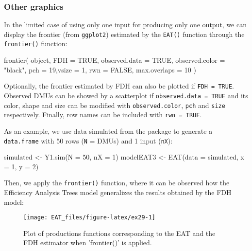 \hypertarget{other-graphics}{%
\subsubsection{Other graphics}\label{other-graphics}}

In the limited case of using only one input for producing only one
output, we can display the frontier (from \texttt{ggplot2}) estimated by
the \texttt{EAT()} function through the \texttt{frontier()} function:

\begin{Schunk}
\begin{Sinput}
frontier(
  object, FDH = TRUE,
  observed.data = TRUE,
  observed.color = "black",
  pch = 19,vsize = 1,
  rwn = FALSE,
  max.overlaps = 10
)
\end{Sinput}
\end{Schunk}

Optionally, the frontier estimated by FDH can also be plotted if
\texttt{FDH\ =\ TRUE}. Observed DMUs can be showed by a scatterplot if
\texttt{observed.data\ =\ TRUE} and its color, shape and size can be
modified with \texttt{observed.color}, \texttt{pch} and \texttt{size}
respectively. Finally, row names can be included with
\texttt{rwn\ =\ TRUE}.

As an example, we use data simulated from the  package to
generate a \texttt{data.frame} with 50 rows (\texttt{N} = DMUs) and 1
input (\texttt{nX}):

\begin{Schunk}
\begin{Sinput}
simulated <- Y1.sim(N = 50, nX = 1)
modelEAT3 <- EAT(data = simulated, x = 1, y = 2)
\end{Sinput}
\end{Schunk}

Then, we apply the \texttt{frontier()} function, where it can be
observed how the Efficiency Analysis Trees model generalizes the results
obtained by the FDH model:

\begin{Schunk}
\begin{figure}

{\centering \texttt{[image: EAT\_files/figure-latex/ex29-1]} 

}

\caption[Plot of productions functions corresponding to the EAT and the FDH estimator when 'frontier()' is applied]{Plot of productions functions corresponding to the EAT and the FDH estimator when 'frontier()' is applied.}\label{fig:ex29}
\end{figure}
\end{Schunk}


